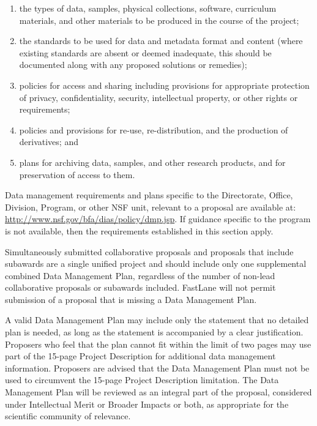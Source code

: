 \begin{enumerate}
\item the types of data, samples, physical collections, software,
  curriculum materials, and other materials to be produced in the
  course of the project;

\item the standards to be used for data and metadata format and
  content (where existing standards are absent or deemed inadequate,
  this should be documented along with any proposed solutions or
  remedies);

\item policies for access and sharing including provisions for
  appropriate protection of privacy, confidentiality, security,
  intellectual property, or other rights or requirements;

\item policies and provisions for re-use, re-distribution, and the
  production of derivatives; and

\item plans for archiving data, samples, and other research products,
  and for preservation of access to them.
\end{enumerate}

Data management requirements and plans specific to the Directorate,
Office, Division, Program, or other NSF unit, relevant to a proposal
are available at: \url{http://www.nsf.gov/bfa/dias/policy/dmp.jsp}. If
guidance specific to the program is not available, then the
requirements established in this section apply.

Simultaneously submitted collaborative proposals and proposals that
include subawards are a single unified project and should include only
one supplemental combined Data Management Plan, regardless of the
number of non-lead collaborative proposals or subawards
included. FastLane will not permit submission of a proposal that is
missing a Data Management Plan.

A valid Data Management Plan may include only the statement that no
detailed plan is needed, as long as the statement is accompanied by a
clear justification. Proposers who feel that the plan cannot fit
within the limit of two pages may use part of the 15-page Project
Description for additional data management information. Proposers are
advised that the Data Management Plan must not be used to circumvent
the 15-page Project Description limitation. The Data Management Plan
will be reviewed as an integral part of the proposal, considered under
Intellectual Merit or Broader Impacts or both, as appropriate for the
scientific community of relevance.

